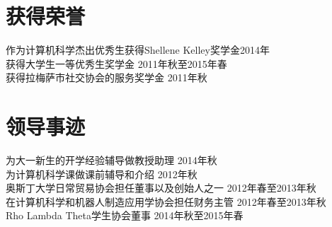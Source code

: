 \documentclass[margin]{res}
\begin{document}
\begin{CJK*}{UTF8}{gbsn}
\begin{resume}

\section{获得荣誉}
作为计算机科学杰出优秀生获得Shellene Kelley奖学金\hfill 2014年\\
获得大学生一等优秀生奖学金 \hfill 2011年秋至2015年春\\
获得拉梅萨市社交协会的服务奖学金 \hfill 2011年秋

\section{领导事迹}
为大一新生的开学经验辅导做教授助理 \hfill 2014年秋\\
为计算机科学课做课前辅导和介绍 \hfill 2012年秋\\
奥斯丁大学日常贸易协会担任董事以及创始人之一 \hfill 2012年春至2013年秋\\
在计算机科学和机器人制造应用学协会担任财务主管 \hfill 2012年春至2013年秋\\
Rho Lambda Theta学生协会董事 \hfill 2014年秋至2015年春

\end{resume}
\clearpage\end{CJK*}
\end{document}
